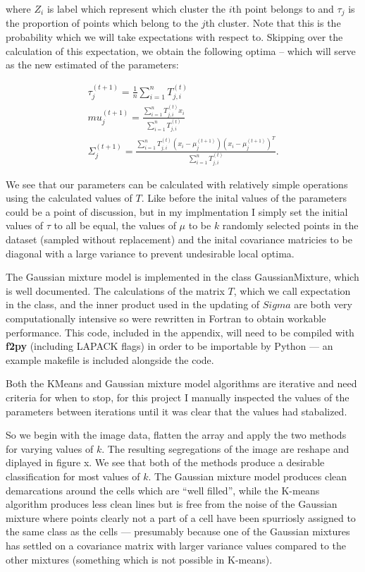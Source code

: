 \documentclass[a4paper]{article}
\begin{document}
where $Z_i$ is label which represent which cluster the $i$th point belongs to and $\tau_j$ is the proportion of points which belong to the $j$th cluster. Note that this is the probability which we will take expectations with respect to. Skipping over the calculation of this expectation, we obtain the following optima -- which will serve as the new estimated of the parameters:

\begin{gather}
\tau_j^{(t+1)} = \frac{1}{n} \sum_{i=1}^n T_{j, i}^{(t)} \\
mu_j^{(t+1)} = \frac{\sum_{i=1}^n T_{j,i}^{(t)} x_i}{\sum_{i=1}^n T_{j,i}^{(t)}} \\
\Sigma_j^{(t+1)} = \frac{\sum_{i=1}^n T_{j,i}^{(t)} (x_i - \mu_j^{(t+1)}){(x_i - \mu_j^{(t+1)})}^T}{\sum_{i=1}^n T_{j,i}^{(t)}}.
\end{gather}

We see that our parameters can be calculated with relatively simple operations using the calculated values of $T$. Like before the inital values of the parameters could be a point of discussion, but in my implmentation I simply set the initial values of $\tau$ to all be equal, the values of $\mu$ to be $k$ randomly selected points in the dataset (sampled without replacement) and the inital covariance matricies to be diagonal with a large variance to prevent undesirable local optima.

The Gaussian mixture model is implemented in the class GaussianMixture, which is well documented. The calculations of the matrix $T$, which we call expectation in the class, and the inner product used in the updating of $Sigma$ are both very computationally intensive so were rewritten in Fortran to obtain workable performance. This code, included in the appendix, will need to be compiled with {\bf f2py} (including LAPACK flags) in order to be importable by Python --- an example makefile is included alongside the code.

Both the KMeans and Gaussian mixture model algorithms are iterative and need criteria for when to stop, for this project I manually inspected the values of the parameters between iterations until it was clear that the values had stabalized. 

So we begin with the image data, flatten the array and apply the two methods for varying values of $k$. The resulting segregations of the image are reshape and diplayed in figure x. We see that both of the methods produce a desirable classification for most values of $k$. The Gaussian mixture model produces clean demarcations around the cells which are ``well filled'', while the K-means algorithm produces less clean lines but is free from the noise of the Gaussian mixture where points clearly not a part of a cell have been spurriosly assigned to the same class as the cells --- presumably because one of the Gaussian mixtures has settled on a covariance matrix with larger variance values compared to the other mixtures (something which is not possible in K-means). 
\end{document}
